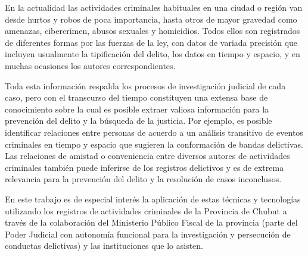 
En la actualidad las actividades criminales habituales en una ciudad o región van desde hurtos y robos de poca importancia, hasta otros de mayor gravedad como amenazas, cibercrimen, abusos sexuales y  homicidios. Todos ellos son registrados de diferentes formas por las fuerzas de la ley, con datos de variada precisión que incluyen usualmente la tipificación del delito, los datos en tiempo y espacio, y en muchas ocasiones los autores correspondientes.

Toda esta información respalda los procesos de investigación judicial de cada caso, pero con el transcurso del tiempo constituyen una extensa base de conocimiento sobre la cual es posible extraer valiosa información para la prevención del delito y la búsqueda de la justicia. Por ejemplo, es posible identificar relaciones entre personas de acuerdo a un análisis transitivo de eventos criminales en tiempo y espacio que sugieren la conformación de bandas delictivas. Las relaciones de amistad o conveniencia entre diversos autores de actividades criminales también puede inferirse de los registros delictivos y es de extrema relevancia para la prevención del delito y la resolución de casos inconclusos.

En este trabajo es de especial interés la aplicación de estas técnicas y tecnologías utilizando los registros de actividades criminales de la Provincia de Chubut a través de la colaboración del Ministerio Público Fiscal de la provincia (parte del Poder Judicial con autonomía funcional para la investigación y persecución de conductas delictivas) y las instituciones que lo asisten.